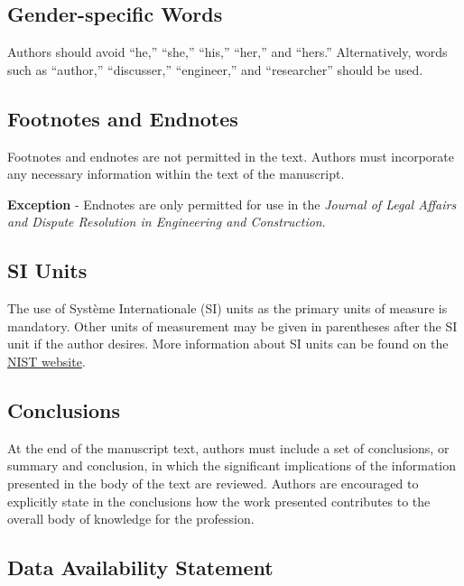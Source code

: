 \documentclass[
  NewProceedings,
  letterpaper]{./assets/ascelike-new}
\begin{document}
\hypertarget{gender-specific-words}{%
\subsection{Gender-specific Words}\label{gender-specific-words}}

Authors should avoid ``he,'' ``she,'' ``his,'' ``her,'' and ``hers.''
Alternatively, words such as ``author,'' ``discusser,'' ``engineer,''
and ``researcher'' should be used.

\hypertarget{footnotes-and-endnotes}{%
\subsection{Footnotes and Endnotes}\label{footnotes-and-endnotes}}

Footnotes and endnotes are not permitted in the text. Authors must
incorporate any necessary information within the text of the manuscript.

\textbf{Exception} - Endnotes are only permitted for use in the
\emph{Journal of Legal Affairs and Dispute Resolution in Engineering and
Construction}.

\hypertarget{si-units}{%
\subsection{SI Units}\label{si-units}}

The use of Système Internationale (SI) units as the primary units of
measure is mandatory. Other units of measurement may be given in
parentheses after the SI unit if the author desires. More information
about SI units can be found on the
\href{http://physics.nist.gov/cuu/Units/index.html}{NIST website}.

\hypertarget{conclusions}{%
\subsection{Conclusions}\label{conclusions}}

At the end of the manuscript text, authors must include a set of
conclusions, or summary and conclusion, in which the significant
implications of the information presented in the body of the text are
reviewed. Authors are encouraged to explicitly state in the conclusions
how the work presented contributes to the overall body of knowledge for
the profession.

\hypertarget{data-availability-statement}{%
\subsection{Data Availability
Statement}\label{data-availability-statement}}
\end{document}
